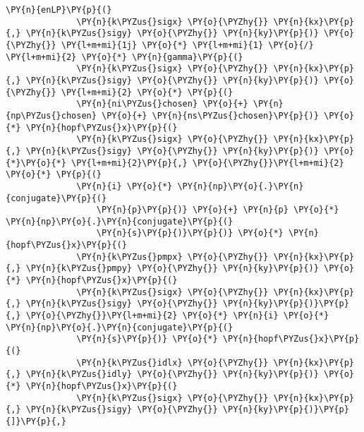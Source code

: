 \begin{Verbatim}[commandchars=\\\{\}]
          \PY{n}{enLP}\PY{p}{(}
              \PY{n}{k\PYZus{}sigx} \PY{o}{\PYZhy{}} \PY{n}{kx}\PY{p}{,} \PY{n}{k\PYZus{}sigy} \PY{o}{\PYZhy{}} \PY{n}{ky}\PY{p}{)} \PY{o}{\PYZhy{}} \PY{l+m+mi}{1j} \PY{o}{*} \PY{l+m+mi}{1} \PY{o}{/} \PY{l+m+mi}{2} \PY{o}{*} \PY{n}{gamma}\PY{p}{(}
              \PY{n}{k\PYZus{}sigx} \PY{o}{\PYZhy{}} \PY{n}{kx}\PY{p}{,} \PY{n}{k\PYZus{}sigy} \PY{o}{\PYZhy{}} \PY{n}{ky}\PY{p}{)} \PY{o}{\PYZhy{}} \PY{l+m+mi}{2} \PY{o}{*} \PY{p}{(}
              \PY{n}{ni\PYZus{}chosen} \PY{o}{+} \PY{n}{np\PYZus{}chosen} \PY{o}{+} \PY{n}{ns\PYZus{}chosen}\PY{p}{)} \PY{o}{*} \PY{n}{hopf\PYZus{}x}\PY{p}{(}
              \PY{n}{k\PYZus{}sigx} \PY{o}{\PYZhy{}} \PY{n}{kx}\PY{p}{,} \PY{n}{k\PYZus{}sigy} \PY{o}{\PYZhy{}} \PY{n}{ky}\PY{p}{)} \PY{o}{*}\PY{o}{*} \PY{l+m+mi}{2}\PY{p}{,} \PY{o}{\PYZhy{}}\PY{l+m+mi}{2} \PY{o}{*} \PY{p}{(}
              \PY{n}{i} \PY{o}{*} \PY{n}{np}\PY{o}{.}\PY{n}{conjugate}\PY{p}{(}
                  \PY{n}{p}\PY{p}{)} \PY{o}{+} \PY{n}{p} \PY{o}{*} \PY{n}{np}\PY{o}{.}\PY{n}{conjugate}\PY{p}{(}
                  \PY{n}{s}\PY{p}{)}\PY{p}{)} \PY{o}{*} \PY{n}{hopf\PYZus{}x}\PY{p}{(}
              \PY{n}{k\PYZus{}pmpx} \PY{o}{\PYZhy{}} \PY{n}{kx}\PY{p}{,} \PY{n}{k\PYZus{}pmpy} \PY{o}{\PYZhy{}} \PY{n}{ky}\PY{p}{)} \PY{o}{*} \PY{n}{hopf\PYZus{}x}\PY{p}{(}
              \PY{n}{k\PYZus{}sigx} \PY{o}{\PYZhy{}} \PY{n}{kx}\PY{p}{,} \PY{n}{k\PYZus{}sigy} \PY{o}{\PYZhy{}} \PY{n}{ky}\PY{p}{)}\PY{p}{,} \PY{o}{\PYZhy{}}\PY{l+m+mi}{2} \PY{o}{*} \PY{n}{i} \PY{o}{*} \PY{n}{np}\PY{o}{.}\PY{n}{conjugate}\PY{p}{(}
              \PY{n}{s}\PY{p}{)} \PY{o}{*} \PY{n}{hopf\PYZus{}x}\PY{p}{(}
              \PY{n}{k\PYZus{}idlx} \PY{o}{\PYZhy{}} \PY{n}{kx}\PY{p}{,} \PY{n}{k\PYZus{}idly} \PY{o}{\PYZhy{}} \PY{n}{ky}\PY{p}{)} \PY{o}{*} \PY{n}{hopf\PYZus{}x}\PY{p}{(}
              \PY{n}{k\PYZus{}sigx} \PY{o}{\PYZhy{}} \PY{n}{kx}\PY{p}{,} \PY{n}{k\PYZus{}sigy} \PY{o}{\PYZhy{}} \PY{n}{ky}\PY{p}{)}\PY{p}{]}\PY{p}{,}

\end{Verbatim}

